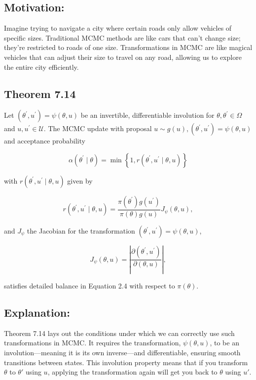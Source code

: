 \documentclass[10pt]{article}
\begin{document}
\subsection*{Motivation:}
Imagine trying to navigate a city where certain roads only allow vehicles of specific sizes. Traditional MCMC methods are like cars that can't change size; they're restricted to roads of one size. Transformations in MCMC are like magical vehicles that can adjust their size to travel on any road, allowing us to explore the entire city efficiently.

\subsection*{Theorem 7.14}
Let $\left(\theta^{\prime}, u^{\prime}\right)=\psi(\theta, u)$ be an invertible, differentiable involution for $\theta, \theta^{\prime} \in \Omega$ and $u, u^{\prime} \in \mathcal{U}$. The MCMC update with proposal $u \sim g(u),\left(\theta^{\prime}, u^{\prime}\right)=\psi(\theta, u)$ and acceptance probability

$$
\alpha\left(\theta^{\prime} \mid \theta\right)=\min \left\{1, r\left(\theta^{\prime}, u^{\prime} \mid \theta, u\right)\right\}
$$

with $r\left(\theta^{\prime}, u^{\prime} \mid \theta, u\right)$ given by

$$
r\left(\theta^{\prime}, u^{\prime} \mid \theta, u\right)=\frac{\pi\left(\theta^{\prime}\right) g\left(u^{\prime}\right)}{\pi(\theta) g(u)} J_\psi(\theta, u),
$$

and $J_\psi$ the Jacobian for the transformation $\left(\theta^{\prime}, u^{\prime}\right)=\psi(\theta, u)$,

$$
J_\psi(\theta, u)=\left|\frac{\partial\left(\theta^{\prime}, u^{\prime}\right)}{\partial(\theta, u)}\right|,
$$

satisfies detailed balance in Equation 2.4 with respect to $\pi(\theta)$.

\subsection*{Explanation:}
Theorem 7.14 lays out the conditions under which we can correctly use such transformations in MCMC. It requires the transformation, \(\psi(\theta, u)\), to be an involution—meaning it is its own inverse—and differentiable, ensuring smooth transitions between states. This involution property means that if you transform \(\theta\) to \(\theta'\) using \(u\), applying the transformation again will get you back to \(\theta\) using \(u'\).
\end{document}
